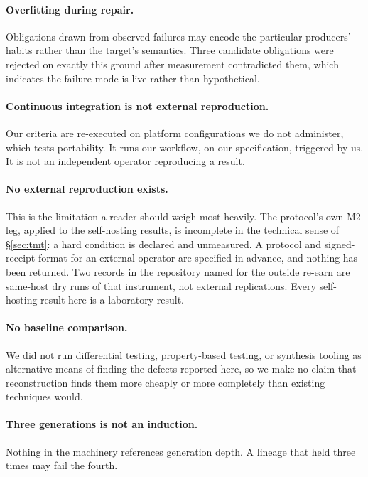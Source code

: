 \documentclass[10pt,twocolumn]{article}
\begin{document}
\paragraph{Overfitting during repair.} Obligations drawn from observed
failures may encode the particular producers' habits rather than the
target's semantics. Three candidate obligations were rejected on exactly
this ground after measurement contradicted them, which indicates the
failure mode is live rather than hypothetical.

\paragraph{Continuous integration is not external reproduction.} Our
criteria are re-executed on platform configurations we do not
administer, which tests portability. It runs our workflow, on our
specification, triggered by us. It is not an independent operator
reproducing a result.

\paragraph{No external reproduction exists.} This is the limitation a
reader should weigh most heavily. The protocol's own M2 leg, applied to
the self-hosting results, is incomplete in the technical sense of
\S\ref{sec:tmt}: a hard condition is declared and unmeasured. A protocol
and signed-receipt format for an external operator are specified in
advance, and nothing has been returned. Two records in the repository
named for the outside re-earn are same-host dry runs of that instrument,
not external replications. Every self-hosting result here is a
laboratory result.

\paragraph{No baseline comparison.} We did not run differential testing,
property-based testing, or synthesis tooling as alternative means of
finding the defects reported here, so we make no claim that
reconstruction finds them more cheaply or more completely than existing
techniques would.

\paragraph{Three generations is not an induction.} Nothing in the
machinery references generation depth. A lineage that held three times
may fail the fourth.
\end{document}
